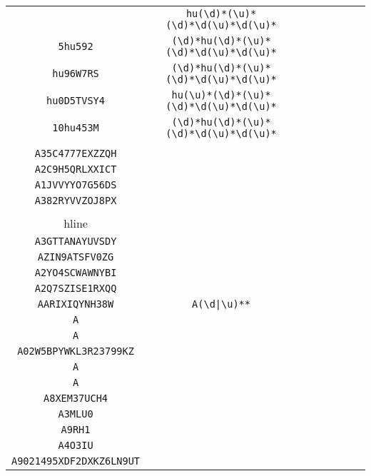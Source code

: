 \begin{longtable}{cccccccc}
\begin{tabular}{ll}
    \verb|hu6907YG| & \verb|hu(\d)*(\u)*(\d)*\d(\u)*\d(\u)*|\\
\verb|5hu592| & \verb|(\d)*hu(\d)*(\u)*(\d)*\d(\u)*\d(\u)*|\\
\verb|hu96W7RS| & \verb|(\d)*hu(\d)*(\u)*(\d)*\d(\u)*\d(\u)*|\\
\verb|hu0D5TVSY4| & \verb|hu(\u)*(\d)*(\u)*(\d)*\d(\u)*\d(\u)*|\\
\verb|10hu453M| & \verb|(\d)*hu(\d)*(\u)*(\d)*\d(\u)*\d(\u)*|
\end{tabular}
\\\midrule 
\begin{tabular}{l}
    \verb|AJDJ6SQUDORP6|\\
\verb|A35C4777EXZZQH|\\
\verb|A2C9H5QRLXXICT|\\
\verb|A1JVVYYO7G56DS|\\
\verb|A382RYVVZOJ8PX|\\
\\hline\\
\verb|A3GTTANAYUVSDY|\\
\verb|AZIN9ATSFV0ZG|\\
\verb|A2YO4SCWAWNYBI|\\
\verb|A2Q7SZISE1RXQQ|\\
\verb|AARIXIQYNH38W|
\end{tabular}

&
\verb.A(\d|\u)**.
&

\begin{tabular}{l}
    \verb|A((\d)*(\u)*(\d)*\d(\u)*\d(\u)*)*|\\
\verb|A|\\
\verb|A|\\
\verb|A02W5BPYWKL3R23799KZ|\\
\verb|A|\\
\verb|A|
\end{tabular}

&

\begin{tabular}{l}
    \verb|A((\d)*\u\u\u)*\d((\u)*\d)*(\u)*|\\
\verb|A8XEM37UCH4|\\
\verb|A3MLU0|\\
\verb|A9RH1|\\
\verb|A4O3IU|\\
\verb|A9021495XDF2DXKZ6LN9UT|
\end{tabular}

&


\end{longtable}
